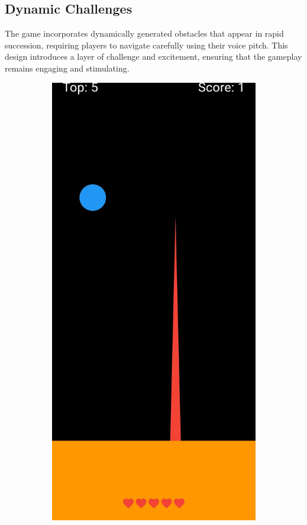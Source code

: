 \documentclass[runningheads]{llncs}
\begin{document}
\subsection{Dynamic Challenges}
The game incorporates dynamically generated obstacles that appear in rapid succession, requiring players to navigate carefully using their voice pitch. This design introduces a layer of challenge and excitement, ensuring that the gameplay remains engaging and stimulating.
\begin{figure}[h]
    \centering
    \begin{subfigure}{0.3\textwidth}
        \centering
        \includegraphics[width=\linewidth]{figures/bot_spike.jpg}

\end{subfigure}
\end{figure}
\end{document}
